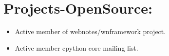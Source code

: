 \section {Projects-OpenSource:}
\begin {itemize}
	\item Active member of webnotes/wnframework project.
	\item Active member cpython core mailing list.
\end {itemize}

